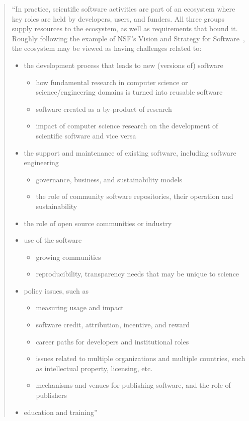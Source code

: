 \documentclass[11pt, oneside]{amsart}
\begin{document}
\begin{quote}
``In practice, scientific software activities are part of an ecosystem
where key roles are held by developers, users, and funders. All three
groups supply resources to the ecosystem, as well as requirements that
bound it. Roughly following the example of NSF's Vision and Strategy
for Software~\cite{NSF_software_vision},
the ecosystem may be viewed as having challenges related to:

\begin{itemize}[leftmargin=0.2in]
\item the development process that leads to new (versions of) software
\begin{itemize}[leftmargin=0.2in]
\item how fundamental research in computer science or
  science/engineering domains is turned into reusable software
\item software created as a by-product of research
\item impact of computer science research on the development of
    scientific software and vice versa
\end{itemize}
\item the support and maintenance of existing software, including
  software engineering
\begin{itemize}[leftmargin=0.2in]
\item governance, business, and sustainability models
\item the role of community software repositories, their operation and
  sustainability
\end{itemize}
\item the role of open source communities or industry
\item use of the software
\begin{itemize}[leftmargin=0.2in]
\item growing communities
\item reproducibility, transparency needs that may be unique to science
\end{itemize}
\item policy issues, such as
\begin{itemize}[leftmargin=0.2in]
\item measuring usage and impact
\item software credit, attribution, incentive, and reward
\item career paths for developers and institutional roles
\item issues related to multiple organizations and multiple countries,
  such as intellectual property, licensing, etc.
\item mechanisms and venues for publishing software, and the role of
  publishers
\end{itemize}
\item education and training''
\end{itemize}

\end{quote}
\end{document}
